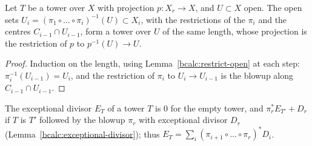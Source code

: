 \begin{lemma}
\label{bcalc:tower-restrict}
\leanok
Let \(T\) be a tower over \(X\) with projection \(p\colon X_r\to X\), and \(U\subset X\) open. The open sets
\(U_i=(\pi_1\circ\dots\circ\pi_i)^{-1}(U)\subset X_i\), with the restrictions of the \(\pi_i\) and the centres \(C_{i-1}\cap U_{i-1}\),
form a tower over \(U\) of the same length, whose projection is the restriction of \(p\) to \(p^{-1}(U)\to U\).
\end{lemma}
\begin{proof}
\leanok
Induction on the length, using Lemma~\ref{bcalc:restrict-open} at each step:
\(\pi_i^{-1}(U_{i-1})=U_i\), and the restriction of \(\pi_i\) to \(U_i\to U_{i-1}\) is the blowup along \(C_{i-1}\cap U_{i-1}\).
\end{proof}

\begin{definition}
\label{bcalc:tower-exceptional}
\leanok
The exceptional divisor \(E_T\) of a tower \(T\) is \(0\) for the empty tower, and \(\pi_r^*E_{T'}+D_r\) if \(T\) is \(T'\) followed by
the blowup \(\pi_r\) with exceptional divisor \(D_r\) (Lemma~\ref{bcalc:exceptional-divisor}); thus
\(E_T=\sum_i(\pi_{i+1}\circ\dots\circ\pi_r)^*D_i\).
\end{definition}

